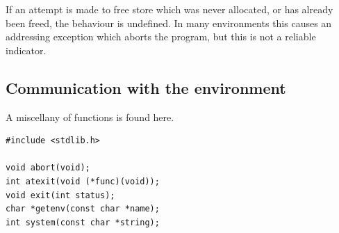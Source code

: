    If an  attempt  is  made  to  free  store  which  was  never allocated,
    or  has  already  been  freed,  the behaviour is undefined.  In many
    environments this causes  an  addressing exception  which  aborts  the
    program,  but  this  is not a reliable indicator.


  

  \subsection{Communication with the environment}
   

   A miscellany of functions is found here.


   \begin{Verbatim}
#include <stdlib.h>

void abort(void);
int atexit(void (*func)(void));
void exit(int status);
char *getenv(const char *name);
int system(const char *string);
\end{Verbatim}

